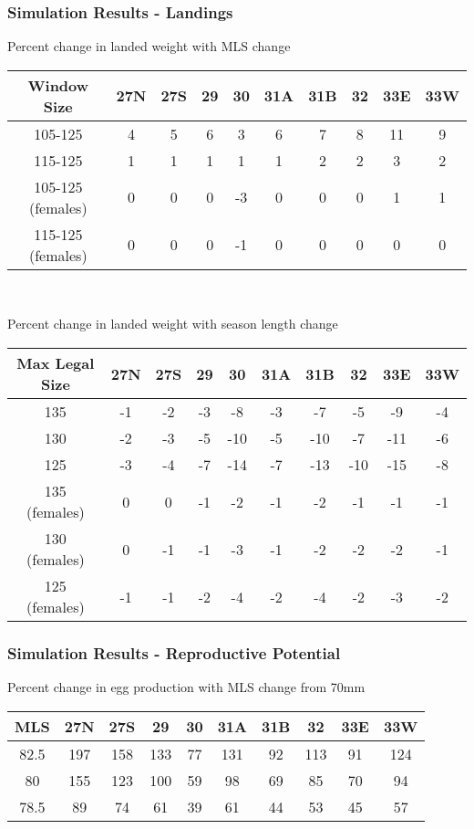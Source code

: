 \documentclass{beamer}
\begin{document}
\begin{frame}
\frametitle{Simulation Results - Landings}
Percent change in  landed weight  with MLS change 
\centering
\begin{tabular}{|c|c|c|c|c|c|c|c|c|c|}
\hline
Window Size       & 27N & 27S & 29 & 30 & 31A & 31B & 32 & 33E & 33W \\
\hline
105-125           & 4 & 5 & 6 & 3 & 6 & 7 & 8 & 11 & 9 \\
\hline
115-125           & 1 & 1 & 1 & 1 & 1 & 2 & 2 & 3 & 2 \\
\hline
105-125 (females)  & 0 & 0 & 0 & -3 & 0 & 0 & 0 & 1 & 1 \\
\hline
115-125 (females)  & 0 & 0 & 0 & -1 & 0 & 0 & 0 & 0 & 0 \\
\hline
 
\end{tabular}\\
\vspace{5mm}

Percent change in  landed weight with season length change 
\centering
\begin{tabular}{|c|c|c|c|c|c|c|c|c|c|}
\hline
Max Legal Size & 27N & 27S & 29 & 30 & 31A & 31B & 32 & 33E & 33W \\
\hline
135            & -1 & -2 & -3 & -8 & -3 & -7 & -5 & -9 & -4 \\
\hline
130            & -2 & -3 & -5 & -10 & -5 & -10 & -7 & -11 & -6 \\
\hline
125            & -3 & -4 & -7 & -14 & -7 & -13 & -10 & -15 & -8 \\
\hline
135 (females)  & 0 & 0 & -1 & -2 & -1 & -2 & -1 & -1 & -1 \\
\hline
130 (females)  & 0 & -1 & -1 & -3 & -1 & -2 & -2 & -2 & -1 \\
\hline
125 (females)   & -1 & -1 & -2 & -4 & -2 & -4 & -2 & -3 & -2 \\
\hline
 
 
\end{tabular}
\end{frame}
 




\begin{frame}
\frametitle{Simulation Results - Reproductive Potential}
Percent change in egg production with MLS change from 70mm
\centering
\begin{tabular}{|c|c|c|c|c|c|c|c|c|c|}
\hline
MLS & 27N & 27S & 29 & 30 & 31A & 31B & 32 & 33E & 33W \\
\hline
82.5 & 197 & 158 & 133 & 77 & 131 & 92 & 113 & 91 & 124 \\
\hline
80 & 155 & 123 & 100 & 59 & 98 & 69 & 85 & 70 & 94 \\
\hline
78.5 & 89 & 74 & 61 & 39 & 61 & 44 & 53 & 45 & 57 \\
\hline



\end{tabular}\\
\end{frame}
\end{document}
